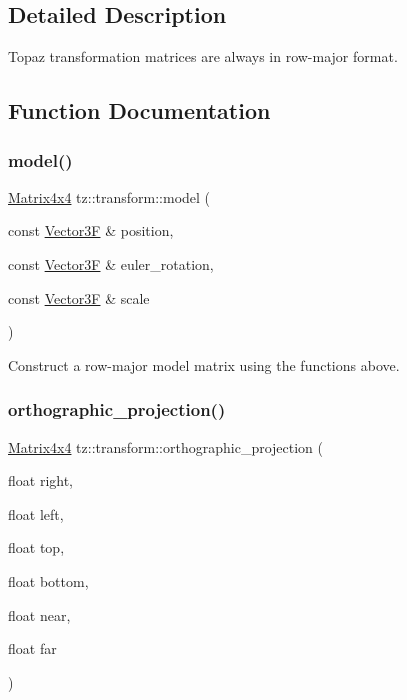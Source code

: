 \subsection{Detailed Description}
Topaz transformation matrices are always in row-\/major format. 

\subsection{Function Documentation}
\mbox{\label{namespacetz_1_1transform_a0cf7e4695205f96b42fcb9fd316193d7}} 
\subsubsection{\texorpdfstring{model()}{model()}}
{\footnotesize\ttfamily \mbox{\hyperlink{class_matrix4x4}{Matrix4x4}} tz\+::transform\+::model (\begin{DoxyParamCaption}\item[{const \mbox{\hyperlink{class_vector3}{Vector3F}} \&}]{position,  }\item[{const \mbox{\hyperlink{class_vector3}{Vector3F}} \&}]{euler\+\_\+rotation,  }\item[{const \mbox{\hyperlink{class_vector3}{Vector3F}} \&}]{scale }\end{DoxyParamCaption})}

Construct a row-\/major model matrix using the functions above. \mbox{\label{namespacetz_1_1transform_a8a5b3be2af4fcc2bb4c92a42bdd563ae}} 
\subsubsection{\texorpdfstring{orthographic\+\_\+projection()}{orthographic\_projection()}}
{\footnotesize\ttfamily \mbox{\hyperlink{class_matrix4x4}{Matrix4x4}} tz\+::transform\+::orthographic\+\_\+projection (\begin{DoxyParamCaption}\item[{float}]{right,  }\item[{float}]{left,  }\item[{float}]{top,  }\item[{float}]{bottom,  }\item[{float}]{near,  }\item[{float}]{far }\end{DoxyParamCaption})}

